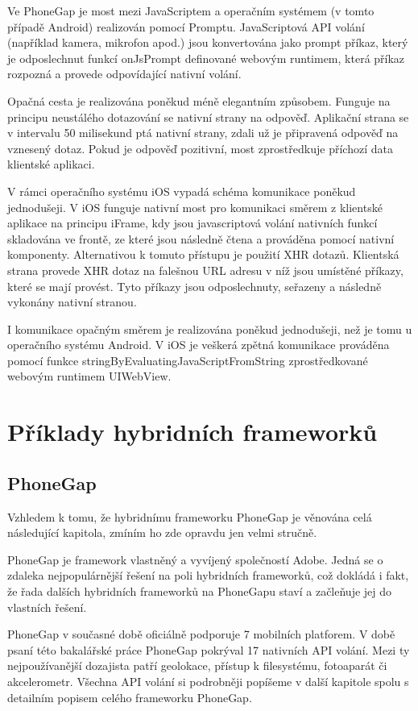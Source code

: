 Ve PhoneGap je most mezi JavaScriptem a operačním systémem (v tomto případě Android) realizován pomocí Promptu. JavaScriptová API volání (například kamera, mikrofon apod.) jsou konvertována jako prompt příkaz, který je odposlechnut funkcí onJsPrompt definované webovým runtimem, která příkaz rozpozná a provede odpovídající nativní volání. \cite{dissecting_phonegap_architecture} 

Opačná cesta je realizována poněkud méně elegantním způsobem. Funguje na principu neustálého dotazování se nativní strany na odpověď. Aplikační strana se v intervalu 50 milisekund ptá nativní strany, zdali už je připravená odpověď na vznesený dotaz. Pokud je odpověď pozitivní, most zprostředkuje příchozí data klientské aplikaci.

V rámci operačního systému iOS vypadá schéma komunikace poněkud jednodušeji. V iOS funguje nativní most pro komunikaci směrem z klientské aplikace na principu iFrame, kdy jsou javascriptová volání nativních funkcí skladována ve frontě, ze které jsou následně čtena a prováděna pomocí nativní komponenty. Alternativou k tomuto přístupu je použití XHR dotazů. Klientská strana provede XHR dotaz na falešnou URL adresu v níž jsou umístěné příkazy, které se mají provést. Tyto příkazy jsou odposlechnuty, seřazeny a následně vykonány nativní stranou. \cite{dissecting_phonegap_architecture}

I komunikace opačným směrem je realizována poněkud jednodušeji, než je tomu u operačního systému Android. V iOS je veškerá zpětná komunikace prováděna pomocí funkce stringByEvaluatingJavaScriptFromString zprostředkované webovým runtimem UIWebView. \cite{dissecting_phonegap_architecture}

\section{Příklady hybridních frameworků}
\subsection{PhoneGap}
Vzhledem k tomu, že hybridnímu frameworku PhoneGap je věnována celá následující kapitola, zmíním ho zde opravdu jen velmi stručně.

PhoneGap je framework vlastněný a vyvíjený společností Adobe. Jedná se o zdaleka nejpopulárnější řešení na poli hybridních frameworků, což dokládá i fakt, že řada dalších hybridních frameworků na PhoneGapu staví a začleňuje jej do vlastních řešení.

PhoneGap v současné době oficiálně podporuje 7 mobilních platforem. V době psaní této bakalářské práce PhoneGap pokrýval 17 nativních API volání. Mezi ty nejpoužívanější dozajista patří geolokace, přístup k filesystému, fotoaparát či akcelerometr. Všechna API volání si podrobněji popíšeme v další kapitole spolu s detailním popisem celého frameworku PhoneGap.

